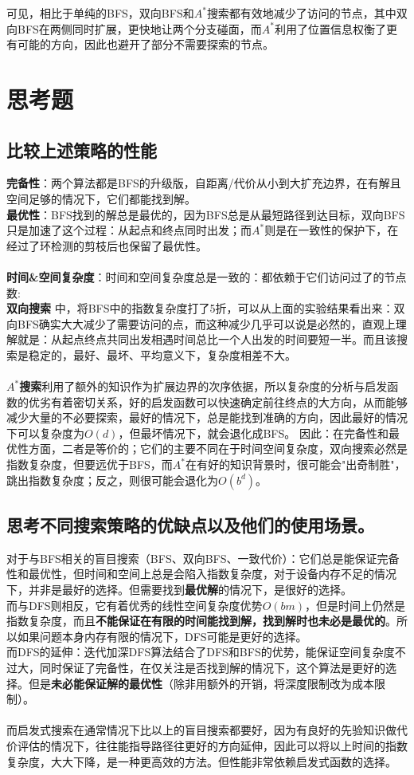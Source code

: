 \documentclass{article}
\begin{document}
\begin{CJK}{UTF8}{gbsn}
	可见，相比于单纯的BFS，双向BFS和$A^*$搜索都有效地减少了访问的节点，其中双向BFS在两侧同时扩展，更快地让两个分支碰面，而$A^*$利用了位置信息权衡了更有可能的方向，因此也避开了部分不需要探索的节点。
\section{思考题}
	\subsection{比较上述策略的性能}
	\textbf{完备性}：两个算法都是BFS的升级版，自距离/代价从小到大扩充边界，在有解且空间足够的情况下，它们都能找到解。\\
	\textbf{最优性}：BFS找到的解总是最优的，因为BFS总是从最短路径到达目标，双向BFS只是加速了这个过程：从起点和终点同时出发；而$A^*$则是在一致性的保护下，在经过了环检测的剪枝后也保留了最优性。\\ \\
	\textbf{时间\&空间复杂度}：时间和空间复杂度总是一致的：都依赖于它们访问过了的节点数:\\ \textbf{双向搜索
}中，将BFS中的指数复杂度打了5折，可以从上面的实验结果看出来：双向BFS确实大大减少了需要访问的点，而这种减少几乎可以说是必然的，直观上理解就是：从起点终点共同出发相遇时间总比一个人出发的时间要短一半。而且该搜索是稳定的，最好、最坏、平均意义下，复杂度相差不大。\\ \\
	\textbf{$A^*$搜索}利用了额外的知识作为扩展边界的次序依据，所以复杂度的分析与启发函数的优劣有着密切关系，好的启发函数可以快速确定前往终点的大方向，从而能够减少大量的不必要探索，最好的情况下，总是能找到准确的方向，因此最好的情况下可以复杂度为$O(d)$，但最坏情况下，就会退化成BFS。
	因此：在完备性和最优性方面，二者是等价的；它们的主要不同在于时间空间复杂度，双向搜索必然是指数复杂度，但要远优于BFS，而$A^*$在有好的知识背景时，很可能会"出奇制胜"，跳出指数复杂度；反之，则很可能会退化为$O(b^d)$。
	
	\subsection{思考不同搜索策略的优缺点以及他们的使用场景。}
	对于与BFS相关的盲目搜索（BFS、双向BFS、一致代价）：它们总是能保证完备性和最优性，但时间和空间上总是会陷入指数复杂度，对于设备内存不足的情况下，并非是最好的选择。但需要找到\textbf{最优解}的情况下，是很好的选择。\\
	而与DFS则相反，它有着优秀的线性空间复杂度优势$O(bm)$，但是时间上仍然是指数复杂度，而且\textbf{不能保证在有限的时间能找到解，找到解时也未必是最优的}。所以如果问题本身内存有限的情况下，DFS可能是更好的选择。\\
	而DFS的延伸：迭代加深DFS算法结合了DFS和BFS的优势，能保证空间复杂度不过大，同时保证了完备性，在仅关注是否找到解的情况下，这个算法是更好的选择。但是\textbf{未必能保证解的最优性}（除非用额外的开销，将深度限制改为成本限制）。\\ \\
	而启发式搜索在通常情况下比以上的盲目搜索都要好，因为有良好的先验知识做代价评估的情况下，往往能指导路径往更好的方向延伸，因此可以将以上时间的指数复杂度，大大下降，是一种更高效的方法。但性能非常依赖启发式函数的选择。
	
\end{CJK}
\end{document}
